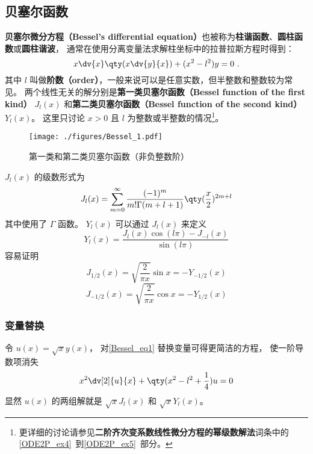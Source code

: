 

\subsection{贝塞尔函数}
\textbf{贝塞尔微分方程（Bessel's differential equation）}也被称为\textbf{柱谐函数}、\textbf{圆柱函数}或\textbf{圆柱谐波}， 通常在使用分离变量法求解柱坐标中的拉普拉斯方程时得到：
\begin{equation}\label{Bessel_eq1}
x\dv{x}\qty(x\dv{y}{x}) + (x^2 - l ^2)y = 0~.
\end{equation}
其中 $l$ 叫做\textbf{阶数（order）}，一般来说可以是任意实数，但半整数和整数较为常见。 两个线性无关的解分别是\textbf{第一类贝塞尔函数（Bessel function of the first kind）} $J_l(x)$ 和\textbf{第二类贝塞尔函数（Bessel function of the second kind）} $Y_l(x)$。 这里只讨论 $x > 0$ 且 $l$ 为整数或半整数的情况\footnote{更详细的讨论请参见\textbf{二阶齐次变系数线性微分方程的幂级数解法}词条中的\autoref{ODE2P_ex4}~到\autoref{ODE2P_ex5}~部分。}。

\begin{figure}[ht]
\centering
\texttt{[image: ./figures/Bessel\_1.pdf]}
\caption{第一类和第二类贝塞尔函数（非负整数阶）} \label{Bessel_fig1}
\end{figure}

$J_l(x)$ 的级数形式为
\begin{equation}\label{Bessel_eq3}
J_l(x) = \sum_{m=0}^\infty \frac{(-1)^m}{m!\Gamma(m+l+1)} \qty(\frac x2)^{2m+l}
\end{equation}
其中使用了 $\Gamma$ 函数。 $Y_l(x)$ 可以通过 $J_l(x)$ 来定义
\begin{equation}
Y_l(x) = \frac{J_l(x)\cos(l\pi) - J_{-l}(x)}{\sin(l\pi)}
\end{equation}
容易证明
\begin{equation}
J_{1/2}(x) = \sqrt{\frac{2}{\pi x}} \sin x = -Y_{-1/2}(x)
\end{equation}
\begin{equation}
J_{-1/2}(x) = \sqrt{\frac{2}{\pi x}} \cos x = -Y_{1/2}(x)
\end{equation}

\subsubsection{变量替换}
令 $u(x) = \sqrt{x} y(x)$， 对\autoref{Bessel_eq1} 替换变量可得更简洁的方程， 使一阶导数项消失
\begin{equation}
x^2\dv[2]{u}{x} + \qty(x^2 - l^2 + \frac{1}{4}) u = 0
\end{equation}
显然 $u(x)$ 的两组解就是 $\sqrt{x}J_l(x)$ 和 $\sqrt{x}Y_l(x)$。

